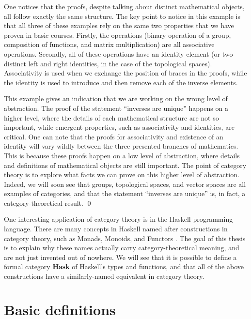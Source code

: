 \documentclass[../thesis.tex]{subfiles}
\begin{document}
\begin{ex}
One notices that the proofs, despite talking about distinct mathematical objects, all follow exactly the same structure.
The key point to notice in this example is that all three of these examples rely on the same two properties that we have proven in basic courses.
Firstly, the operations (binary operation of a group, composition of functions, and matrix multiplication) are all associative operations.
Secondly, all of these operations have an identity element (or two distinct left and right identities, in the case of the topological spaces). 
Associativity is used when we exchange the position of braces in the proofs, while the identity is used to introduce and then remove each of the inverse elements.

This example gives an indication that we are working on the wrong level of abstraction.
The proof of the statement ``inverses are unique'' happens on a higher level, where the details of each mathematical structure are not so important, while emergent properties, such as associativity and identities, are critical.
One can note that the proofs for associativity and existence of an identity will vary wildly between the three presented branches of mathematics.
This is because these proofs happen on a low level of abstraction, where details and definitions of mathematical objects are still important.
The point of category theory is to explore what facts we can prove on this higher level of abstraction.
Indeed, we will soon see that groups, topological spaces, and vector spaces are all examples of categories, and that the statement ``inverses are unique'' is, in fact, a category-theoretical result.
\qed
\end{ex}

One interesting application of category theory is in the Haskell programming language.
There are many concepts in Haskell named after constructions in category theory, such as Monads, Monoids, and Functors \cite{haskmooc}.
The goal of this thesis is to explain why these names actually carry category-theoretical meaning, and are not just invented out of nowhere.
We will see that it is possible to define a formal category \textbf{Hask} of Haskell's types and functions, and that all of the above constructions have a similarly-named equivalent in category theory.

\section{Basic definitions}
\end{document}
